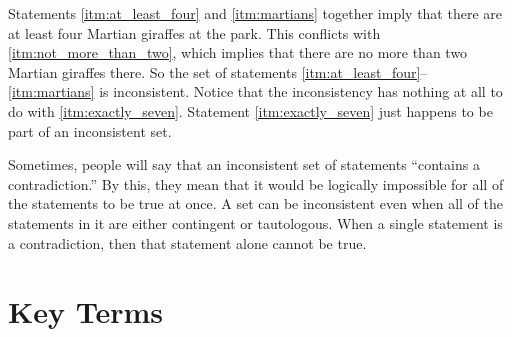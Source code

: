 Statements \ref{itm:at_least_four} and \ref{itm:martians} together imply that there are at least four Martian giraffes at the park. This conflicts with \ref{itm:not_more_than_two}, which implies that there are no more than two Martian giraffes there. So the set of statements \ref{itm:at_least_four}--\ref{itm:martians} is inconsistent. Notice that the inconsistency has nothing at all to do with \ref{itm:exactly_seven}. Statement \ref{itm:exactly_seven} just happens to be part of an inconsistent set.

Sometimes, people will say that an inconsistent set of statements ``contains a contradiction.'' By this, they mean that it would be logically impossible for all of the statements to be true at once. A set can be inconsistent even when all of the statements in it are either contingent or tautologous. When a single statement is a contradiction, then that statement alone cannot be true.



\section*{Key Terms}
\begin{fullwidth}
\begin{sortedlist}
\end{sortedlist}
\end{fullwidth}
